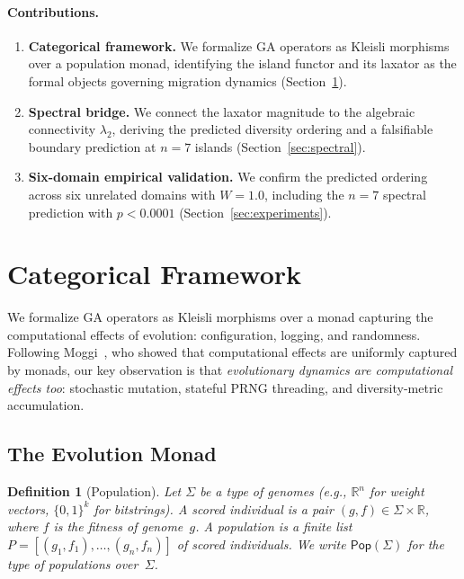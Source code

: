 \documentclass[submission,copyright,creativecommons]{eptcs}
\newtheorem{definition}{Definition}
\begin{document}
\paragraph{Contributions.}
\begin{enumerate}
\item \textbf{Categorical framework.} We formalize GA operators as
  Kleisli morphisms over a population monad, identifying the island
  functor and its laxator as the formal objects governing migration
  dynamics (Section~\ref{sec:framework}).
\item \textbf{Spectral bridge.} We connect the laxator magnitude to
  the algebraic connectivity $\lambda_2$, deriving the predicted
  diversity ordering and a falsifiable boundary prediction at
  $n{=}7$ islands (Section~\ref{sec:spectral}).
\item \textbf{Six-domain empirical validation.} We confirm the
  predicted ordering across six unrelated domains with $W = 1.0$,
  including the $n{=}7$ spectral prediction with $p < 0.0001$
  (Section~\ref{sec:experiments}).
\end{enumerate}

\section{Categorical Framework}
\label{sec:framework}

We formalize GA operators as Kleisli morphisms over a monad capturing
the computational effects of evolution: configuration, logging, and
randomness. Following Moggi~\cite{moggi1991notions}, who showed that
computational effects are uniformly captured by monads, our key
observation is that \emph{evolutionary dynamics are computational
effects too}: stochastic mutation, stateful PRNG threading, and
diversity-metric accumulation.

\subsection{The Evolution Monad}
\label{sec:monad}

\begin{definition}[Population]
Let $\Sigma$ be a type of \emph{genomes} (e.g., $\mathbb{R}^n$ for
weight vectors, $\{0,1\}^k$ for bitstrings). A \emph{scored individual}
is a pair $(g, f) \in \Sigma \times \mathbb{R}$, where $f$ is the
fitness of genome~$g$. A \emph{population} is a finite list
$P = [(g_1, f_1), \ldots, (g_n, f_n)]$ of scored individuals.
We write $\mathsf{Pop}(\Sigma)$ for the type of populations over~$\Sigma$.
\end{definition}
\end{document}
